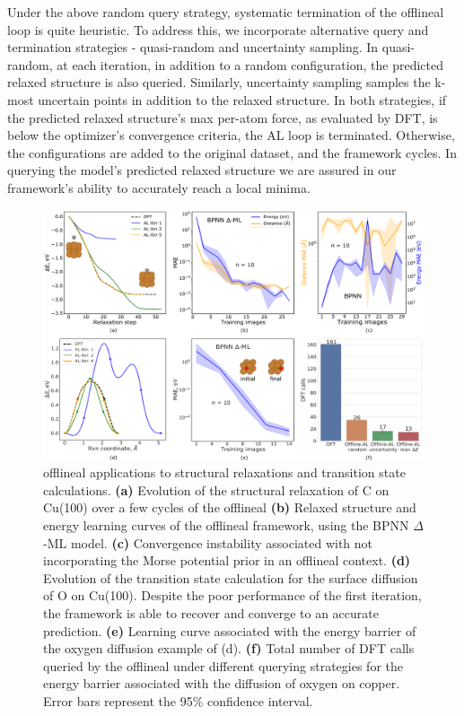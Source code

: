 \documentclass[
 reprint,
 amsmath,
 amssymb,
 aps,
]{revtex4-1}
\begin{document}
Under the above random query strategy, systematic termination of the \gls{offlineal} loop is quite heuristic. To address this, we incorporate alternative query and termination strategies - quasi-random and uncertainty sampling. In quasi-random, at each iteration, in addition to a random configuration, the predicted relaxed structure is also queried. Similarly, uncertainty sampling samples the k-most uncertain points in addition to the relaxed structure. In both strategies, if the predicted relaxed structure's max per-atom force, as evaluated by DFT, is below the optimizer's convergence criteria, the AL loop is terminated. Otherwise, the configurations are added to the original dataset, and the framework cycles. In querying the model's predicted relaxed structure we are assured in our framework's ability to accurately reach a local minima.

\begin{figure}[ht]
    \centering
    \includegraphics[width=\textwidth]{figures/figure_3.pdf}
    \caption{ \gls{offlineal} applications to structural relaxations and transition state calculations. \textbf{(a)} Evolution of the structural relaxation of C on Cu(100) over a few cycles of the \gls{offlineal} \textbf{(b)} Relaxed structure and energy learning curves of the \gls{offlineal} framework, using the BPNN $\Delta$-ML model. \textbf{(c)} Convergence instability associated with not incorporating the Morse potential prior in an \gls{offlineal} context. \textbf{(d)} Evolution of the transition state calculation for the surface diffusion of O on Cu(100). Despite the poor performance of the first iteration, the framework is able to recover and converge to an accurate prediction. \textbf{(e)} Learning curve associated with the energy barrier of the oxygen diffusion example of (d). \textbf{(f)} Total number of DFT calls queried by the \gls{offlineal} under different querying strategies for the energy barrier associated with the diffusion of oxygen on copper. Error bars represent the 95\% confidence interval.
    }
    
    \label{fig:al_relax}
\end{figure}
\end{document}
